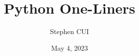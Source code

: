 \documentclass[openany]{book}
\title{\textbf{Python One-Liners}}
\author{Stephen CUI}
\date{May 4, 2023}
\begin{document}
\maketitle

\begin{multicols}{2}
    \tableofcontents
\end{multicols}


\end{document}
